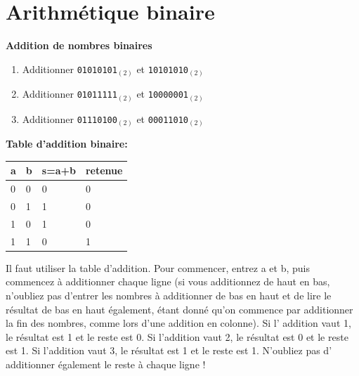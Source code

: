 \section{Arithmétique binaire}

\begin{Exercice}[15 minutes] \textbf{Addition de nombres binaires}
    \begin{enumerate}
        \item Additionner \lstinline{01010101}$_{(2)}$ et \lstinline{10101010}$_{(2)}$
        \item Additionner \lstinline{01011111}$_{(2)}$ et \lstinline{10000001}$_{(2)}$
        \item Additionner \lstinline{01110100}$_{(2)}$ et \lstinline{00011010}$_{(2)}$
    \end{enumerate}
    \begin{conseil}
\textbf{Table d'addition binaire:}\\
        \begin{tabular}{| C{0.1\textwidth} | C{0.1\textwidth} | C{0.1\textwidth} | C{0.1\textwidth} |} 
            \hline
            \textbf{a} & \textbf{b} & \textbf{s=a+b} & \textbf{retenue}\\ [0.5ex]
             & 0 & 0 & 0 \\ [0.5ex] 
             & 1 & 1 & 0 \\ [0.5ex] 
             & 0 & 1 & 0 \\ [0.5ex] 
             & 1 & 0 & 1 \\ [0.5ex] 
            \hline
        \end{tabular}
    \end{conseil}
    
    \begin{solution}
        Il faut utiliser la table d'addition. Pour commencer, entrez a et b, puis commencez à additionner chaque ligne (si vous additionnez de haut en bas, n'oubliez pas d'entrer les nombres à additionner de bas en haut et de lire le résultat de bas en haut également, étant donné qu'on commence par additionner la fin des nombres, comme lors d'une addition en colonne). Si l' addition vaut 1, le résultat est 1 et le reste est 0. Si l'addition vaut 2, le résultat est 0 et le reste est 1. Si l'addition vaut 3, le résultat est 1 et le reste est 1. N'oubliez pas d' additionner également le reste à chaque ligne ! \\
        

\end{solution}
\end{Exercice}
